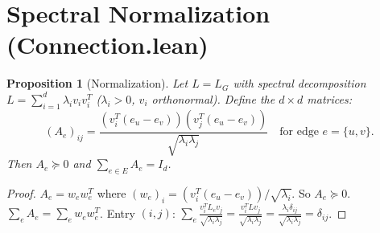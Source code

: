 \documentclass{article}
\newtheorem{proposition}[theorem]{Proposition}
\theoremstyle{definition}
\begin{document}
\section{Spectral Normalization (Connection.lean)}

\begin{proposition}[Normalization]\label{prop:normalize}
Let $L = L_G$ with spectral decomposition $L = \sum_{i=1}^d \lambda_i v_i v_i^T$
($\lambda_i > 0$, $v_i$ orthonormal). Define the $d \times d$ matrices:
\[
  (A_e)_{ij} = \frac{(v_i^T (e_u - e_v))(v_j^T (e_u - e_v))}{\sqrt{\lambda_i \lambda_j}}
  \quad\text{for edge } e = \{u,v\}.
\]
Then $A_e \succeq 0$ and $\sum_{e \in E} A_e = I_d$.
\end{proposition}
\begin{proof}
$A_e = w_e w_e^T$ where $(w_e)_i = (v_i^T(e_u - e_v))/\sqrt{\lambda_i}$. So $A_e \succeq 0$.
$\sum_e A_e = \sum_e w_e w_e^T$. Entry $(i,j)$:
$\sum_e \frac{v_i^T L_e v_j}{\sqrt{\lambda_i \lambda_j}}
= \frac{v_i^T L v_j}{\sqrt{\lambda_i \lambda_j}}
= \frac{\lambda_i \delta_{ij}}{\sqrt{\lambda_i \lambda_j}} = \delta_{ij}$.
\end{proof}
\end{document}

